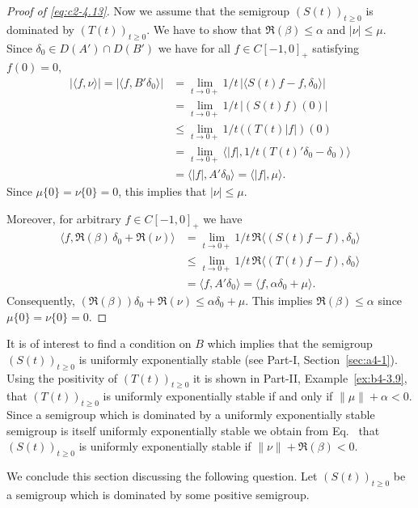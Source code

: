 \begin{example}
\begin{proof}[Proof of \eqref{eq:c2-4.13}]
Now we assume that the semigroup $(S(t))_{t \geq 0}$ is dominated by $(T(t))_{t \geq 0}$.
We have to show that $\Re(\beta) \leq \alpha$ and $|\nu| \leq \mu$.
Since $\delta_{0} \in D(A') \cap D(B')$ we have for all $f \in C[-1,0]_{+}$ satisfying $f(0) = 0$,
\begin{align*}
|\langle f,\nu\rangle| = |\langle f,B'\delta_{0}\rangle| &= \lim_{t \to 0+} 1/t \, |\langle S(t)f - f , \delta_{0}\rangle|\\
%
&= \lim_{t \to 0+} 1/t \, |(S(t)f)(0)|  \\
&\leq \lim_{t \to 0+} 1/t \, ((T(t)|f|)(0) \\
&= \lim_{t \to 0+} \langle|f|,1/t(T(t)'\delta_{0} - \delta_{0})\rangle \\
&= \langle|f|,A'\delta_{0}\rangle = \langle|f|,\mu\rangle.
\end{align*}
Since $\mu\{0\} = \nu\{0\} = 0$, this implies that $|\nu| \leq \mu$.

Moreover, for arbitrary $f \in C[-1,0]_{+}$ we have
\begin{align*}
\langle f,\Re(\beta) \, \delta_{0} + \Re(\nu)\rangle &= \lim_{t \to 0+} 1/t \, \Re\langle(S(t)f - f),\delta_{0}\rangle\\
&\leq \lim_{t \to 0+} 1/t \, \Re\langle(T(t)f - f),\delta_{0}\rangle \\
&= \langle f,A'\delta_{0}\rangle = \langle f,\alpha\delta_{0} + \mu\rangle.
\end{align*}
Consequently, $(\Re(\beta))\delta_{0} + \Re(\nu) \leq \alpha\delta_{0} + \mu$.
This implies $\Re(\beta) \leq \alpha$ since $\mu \{0\}  = \nu\{0\}  = 0$.
\end{proof}
\end{example}
\begin{remark*}
It is of interest to find a condition on $B$ which implies that the semigroup $(S(t))_{t \geq 0}$ is uniformly exponentially stable (see Part-I, Section~\ref{sec:a4-1}).
Using the positivity of\/ $(T(t))_{t \geq 0}$ it is shown in Part-II, Example~\ref{ex:b4-3.9}, that
$(T(t))_{t \geq 0}$ is uniformly exponentially stable if and only if\/ $\|\mu\| + \alpha < 0$.
Since a semigroup which is dominated by a uniformly exponentially stable semigroup is itself uniformly exponentially stable we obtain from Eq.~ that $(S(t))_{t \geq 0}$ is uniformly exponentially stable if\/ $\|\nu\| + \Re(\beta) < 0$.
\end{remark*}
We conclude this section discussing the following question.
Let $(S(t))_{t \geq 0}$ be a semigroup which is dominated by some positive semigroup.
